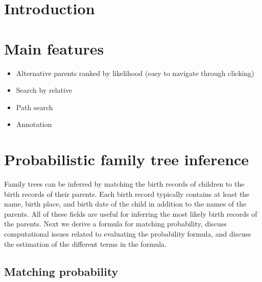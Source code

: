 \documentclass[sigconf]{acmart}
\begin{document}
\fi




\maketitle

\section{Introduction}

\section{Main features}

\begin{itemize}
 \item Alternative parents ranked by likelihood (easy to navigate through 
 clicking)
 \item Search by relative
 \item Path search
 \item Annotation
\end{itemize}

\section{Probabilistic family tree inference}

Family trees can be inferred by matching the birth records of children to the 
birth records of their parents. Each birth record typically contains at least 
the name, birth place, and birth date of the child in addition to the names of 
the parents. All of these fields are useful for inferring the most likely birth 
records of the parents. Next we derive a formula for matching probability, 
discuss computational issues related to evaluating the probability formula, and 
discuss the estimation of the different terms in the formula.

\subsection{Matching probability}
\end{document}
